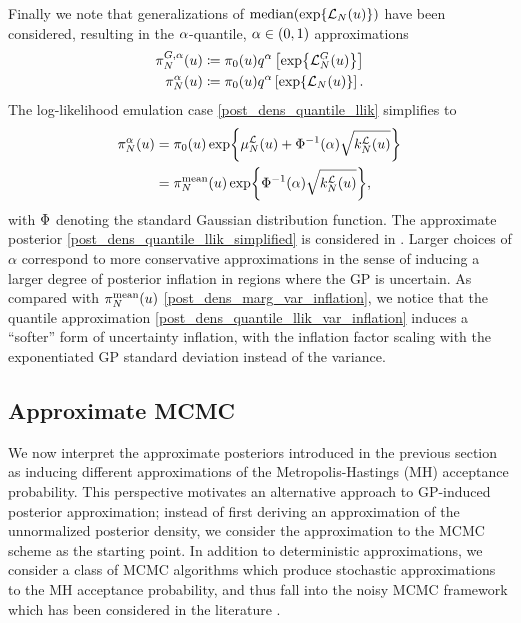 \documentclass[12pt]{article}
\begin{document}
Finally we note that generalizations of $\text{median}(\Exp{\llikEm[\Ndesign](\Par)})$ have been considered, 
resulting in the $\quantileProb$-quantile, $\quantileProb \in (0,1)$ approximations 
\begin{align}
\fwdEmQDens[\Ndesign](\Par) &\Def \priorDens(\Par) \quantile \left[\Exp{\llikEmFwd[\Ndesign](\Par)} \right] \label{post_dens_quantile_fwd} \\
\llikEmQDens[\Ndesign](\Par) &\Def \priorDens(\Par) \quantile \left[\Exp{\llikEm[\Ndesign](\Par)} \right]. \label{post_dens_quantile_llik}
\end{align}
The log-likelihood emulation case \ref{post_dens_quantile_llik} simplifies to 
\begin{align}
\llikEmQDens[\Ndesign](\Par) 
&= \priorDens(\Par) \Exp{\emMean[\Ndesign]{\llik}(\Par) + \GaussianCDF^{-1}(\quantileProb) \sqrt{\emKer[\Ndesign]{\llik}(\Par)}} 
\label{post_dens_quantile_llik_simplified} \\
&= \llikEmMeanDens[\Ndesign](\Par) \Exp{\GaussianCDF^{-1}(\quantileProb) \sqrt{\emKer[\Ndesign]{\llik}(\Par)}},
\label{post_dens_quantile_llik_var_inflation}
\end{align}
with $\GaussianCDF$ denoting the standard Gaussian distribution function. The approximate posterior 
\ref{post_dens_quantile_llik_simplified} is considered in \cite{VehtariParallelGP, quantileApprox}. Larger choices 
of $\alpha$ correspond to more conservative approximations in the sense of inducing a larger degree of posterior 
inflation in regions where the GP is uncertain. As compared with $\llikEmMeanDens[\Ndesign](\Par)$
\ref{post_dens_marg_var_inflation}, we notice that the quantile approximation \ref{post_dens_quantile_llik_var_inflation}
induces a ``softer'' form of uncertainty inflation, with the inflation factor scaling with the exponentiated GP standard 
deviation instead of the variance. 

\subsection{Approximate MCMC}
We now interpret the approximate posteriors introduced in the previous section as inducing different 
approximations of the Metropolis-Hastings (MH) acceptance probability. This perspective motivates 
an alternative approach to GP-induced posterior approximation; instead of first deriving an 
approximation of the unnormalized posterior density, we consider the approximation to the MCMC 
scheme as the starting point. In addition to deterministic approximations,
we consider a class of MCMC algorithms which produce stochastic approximations to the MH acceptance 
probability, and thus fall into the noisy MCMC 
framework which has been considered in the literature 
\cite{noisyMCMC, stabilityNoisyMH, noisyMCSurvey, pseudoMarginalMCMC}. 
\end{document}
